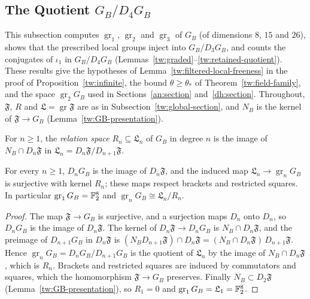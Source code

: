 \subsection{\texorpdfstring{The Quotient $G_B/D_4G_B$}{The Quotient G\_B/D\_4G\_B}}\label{tw:retained-section}
This subsection computes $\operatorname{gr}_1$, $\operatorname{gr}_2$ and
$\operatorname{gr}_3$ of $G_B$ (of dimensions $8$, $15$ and $26$), shows that
the prescribed local groups inject into $G_B/D_3G_B$, and counts the
conjugates of $\iota_1$ in $G_B/D_4G_B$
(Lemmas~\ref{tw:graded}--\ref{tw:retained-quotient}). These results give
the hypotheses of Lemma~\ref{tw:filtered-local-freeness} in the proof of
Proposition~\ref{tw:infinite}, the bound $\theta\ge\theta_*$ of
Theorem~\ref{tw:field-family}, and the space $\operatorname{gr}_2G_B$ used in
Sections~\ref{an:section} and~\ref{dh:section}. Throughout, $\mathfrak F$,
$R$ and $\mathfrak L=\operatorname{gr}\mathfrak F$ are as in
Subsection~\ref{tw:global-section}, and $N_B$ is the kernel of
$\mathfrak F\to G_B$ (Lemma~\ref{tw:GB-presentation}).

\begin{definition}\label{tw:relation-space}
For $n\ge1$, the \emph{relation space} $R_n\subseteq\mathfrak L_n$ of $G_B$
in degree $n$ is the image of $N_B\cap D_n\mathfrak F$ in
$\mathfrak L_n=D_n\mathfrak F/D_{n+1}\mathfrak F$.
\end{definition}

\begin{lemma}\label{tw:graded}
For every $n\ge1$, $D_nG_B$ is the image of $D_n\mathfrak F$, and the induced
map $\mathfrak L_n\to\operatorname{gr}_nG_B$ is surjective with kernel $R_n$;
these maps respect brackets and restricted squares. In particular
$\operatorname{gr}_1G_B=\mathbb F_2^8$ and
$\operatorname{gr}_nG_B\cong\mathfrak L_n/R_n$.
\end{lemma}

\begin{proof}
The map $\mathfrak F\to G_B$ is surjective, and a surjection maps $D_n$ onto
$D_n$, so $D_nG_B$ is the image of $D_n\mathfrak F$. The kernel of
$D_n\mathfrak F\to D_nG_B$ is $N_B\cap D_n\mathfrak F$, and the preimage of
$D_{n+1}G_B$ in $D_n\mathfrak F$ is
$(N_BD_{n+1}\mathfrak F)\cap D_n\mathfrak F=(N_B\cap D_n\mathfrak F)\,D_{n+1}\mathfrak F$.
Hence $\operatorname{gr}_nG_B=D_nG_B/D_{n+1}G_B$ is the quotient of
$\mathfrak L_n$ by the image of $N_B\cap D_n\mathfrak F$, which is $R_n$.
Brackets and restricted squares are induced by commutators and squares, which
the homomorphism $\mathfrak F\to G_B$ preserves. Finally
$N_B\subset D_2\mathfrak F$ (Lemma~\ref{tw:GB-presentation}), so $R_1=0$ and
$\operatorname{gr}_1G_B=\mathfrak L_1=\mathbb F_2^8$.
\end{proof}

